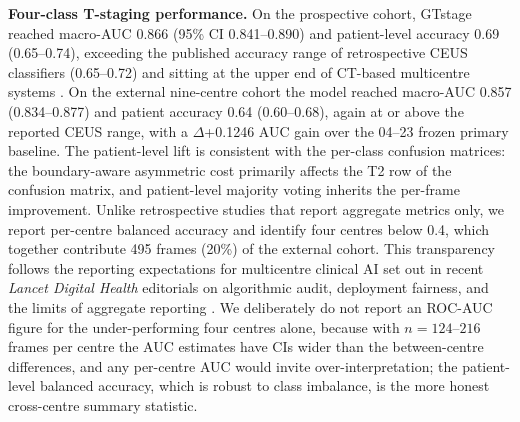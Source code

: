 \documentclass[11pt,a4paper]{article}
\begin{document}
\textbf{Four-class T-staging performance.} On the prospective cohort, GTstage reached macro-AUC 0.866 (95\% CI 0.841--0.890) and patient-level accuracy 0.69 (0.65--0.74), exceeding the published accuracy range of retrospective CEUS classifiers (0.65--0.72) \cite{liu2018ceus, zheng2017ceus} and sitting at the upper end of CT-based multicentre systems \cite{zheng2025interpretable, tao2024ct, liang2023ct, zhang2024ct}. On the external nine-centre cohort the model reached macro-AUC 0.857 (0.834--0.877) and patient accuracy 0.64 (0.60--0.68), again at or above the reported CEUS range, with a $\Delta$+0.1246 AUC gain over the 04--23 frozen primary baseline. The patient-level lift is consistent with the per-class confusion matrices: the boundary-aware asymmetric cost primarily affects the T2 row of the confusion matrix, and patient-level majority voting inherits the per-frame improvement. Unlike retrospective studies that report aggregate metrics only, we report per-centre balanced accuracy and identify four centres below 0.4, which together contribute 495 frames (20\%) of the external cohort. This transparency follows the reporting expectations for multicentre clinical AI set out in recent \emph{Lancet Digital Health} editorials on algorithmic audit, deployment fairness, and the limits of aggregate reporting \cite{finlayson2022audit, sounderajah2022aipath, mccradden2020ethics, esteva2021guidebook}. We deliberately do not report an ROC-AUC figure for the under-performing four centres alone, because with $n=124$--$216$ frames per centre the AUC estimates have CIs wider than the between-centre differences, and any per-centre AUC would invite over-interpretation; the patient-level balanced accuracy, which is robust to class imbalance, is the more honest cross-centre summary statistic.
\end{document}
